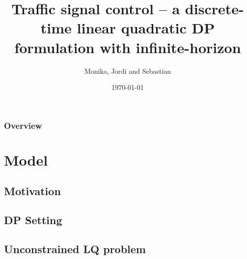 \documentclass{beamer}
\title[Traffic control]{Traffic signal control – a discrete-time linear quadratic DP formulation with infinite-horizon} %
\author{Monika, Jordi and Sebastian} %
\institute[BGSE] %
{
Barcelona Graduate School of Economics \\ %
\medskip
}
\date{\today} %
\begin{document}
\begin{frame}
\titlepage %
\end{frame}

\begin{frame}
\frametitle{Overview} %
\tableofcontents %
\end{frame}


\section{Model} %

\subsection{Motivation} %
\subsection{DP Setting} %
\subsection{Unconstrained LQ problem} %
\end{document}
